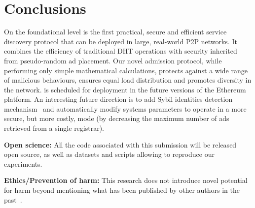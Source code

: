 
\section{Conclusions}
\label{sec:con}
On the foundational level \sysname is the first practical, secure and efficient service discovery protocol that can be deployed in large, real-world P2P networks. It combines the efficiency of traditional DHT operations with security inherited from pseudo-random ad placement. Our novel admission protocol, while performing only simple mathematical calculations, protects against a wide range of malicious behaviours, ensures equal load distribution and promotes diversity in the network.
\sysname is scheduled for deployment in the future versions of the Ethereum platform. 
An interesting future direction is to add Sybil identities detection mechanism~\cite{cholez2010efficient} and automatically modify systems parameters to operate in a more secure, but more costly, mode (\eg by decreasing the maximum number of ads retrieved from a single registrar). 


{\footnotesize

\smallskip

\noindent
\textbf{Open science:} All the code associated with this submission will be released open source, as well as datasets and scripts allowing to reproduce our experiments.

\smallskip

\footnotesize
\noindent
\textbf{Ethics/Prevention of harm:} This research does not introduce novel potential for harm beyond mentioning what has been published by other authors in the past~\cite{marcus2018low,henningsen2019eclipsing}.
}
